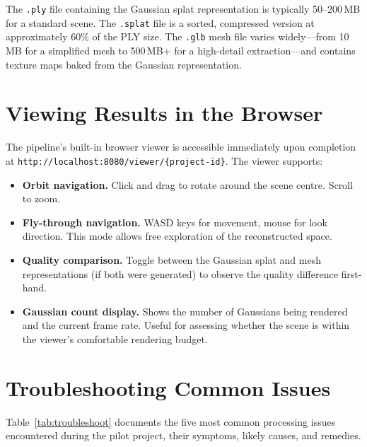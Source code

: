 \begin{technote}
The \texttt{.ply} file containing the Gaussian splat representation is typically 50--200\,MB for a standard scene. The \texttt{.splat} file is a sorted, compressed version at approximately 60\% of the PLY size. The \texttt{.glb} mesh file varies widely---from 10\,MB for a simplified mesh to 500\,MB+ for a high-detail extraction---and contains texture maps baked from the Gaussian representation.
\end{technote}

\section{Viewing Results in the Browser}
\label{sec:proc-viewing}

The pipeline's built-in browser viewer is accessible immediately upon completion at \texttt{http://localhost:8080/viewer/\{project-id\}}. The viewer supports:

\begin{itemize}
  \item \textbf{Orbit navigation.} Click and drag to rotate around the scene centre. Scroll to zoom.
  \item \textbf{Fly-through navigation.} WASD keys for movement, mouse for look direction. This mode allows free exploration of the reconstructed space.
  \item \textbf{Quality comparison.} Toggle between the Gaussian splat and mesh representations (if both were generated) to observe the quality difference first-hand.
  \item \textbf{Gaussian count display.} Shows the number of Gaussians being rendered and the current frame rate. Useful for assessing whether the scene is within the viewer's comfortable rendering budget.
\end{itemize}

\section{Troubleshooting Common Issues}
\label{sec:proc-troubleshoot}

Table~\ref{tab:troubleshoot} documents the five most common processing issues encountered during the pilot project, their symptoms, likely causes, and remedies.

